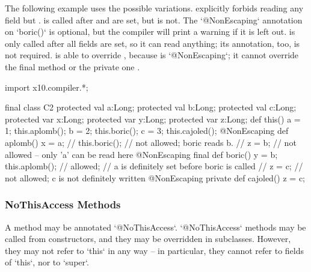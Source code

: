 The following example uses the possible variations.   
explicitly forbids reading any field but
.  is called after  and  are set, but
 is not.
The \xcd`@NonEscaping` annotation on \xcd`boric()` is optional, but the
compiler will print a warning if it is left out.
 is only called after all fields are set, so it
can read anything; its annotation, too, is not required.    is able to override , because
 is \xcd`@NonEscaping`; it cannot override the final method
 or the private one .  
\begin{xten}
import x10.compiler.*;

final class C2 {
  protected val a:Long; protected val b:Long; protected val c:Long;
  protected var x:Long; protected var y:Long; protected var z:Long;
  def this() {
    a = 1;
    this.aplomb();
    b = 2;
    this.boric();
    c = 3;
    this.cajoled();
  }
  @NonEscaping def aplomb() {
    x = a;
    // this.boric(); // not allowed; boric reads b.
    // z = b; // not allowed -- only 'a' can be read here
  }
  @NonEscaping final def boric() {
    y = b;
    this.aplomb(); // allowed; 
       // a is definitely set before boric is called
    // z = c; // not allowed; c is not definitely written
  }
  @NonEscaping private def cajoled() {
    z = c;
  }
}

\end{xten}
%

\subsubsection{NoThisAccess Methods}

A method may be annotated \xcd`@NoThisAccess`.  \xcd`@NoThisAccess` methods
may be called from constructors, and they may be overridden in subclasses.
However, they may not refer to \xcd`this` in any way -- in particular, they
cannot refer to fields of \xcd`this`, nor to \xcd`super`.

